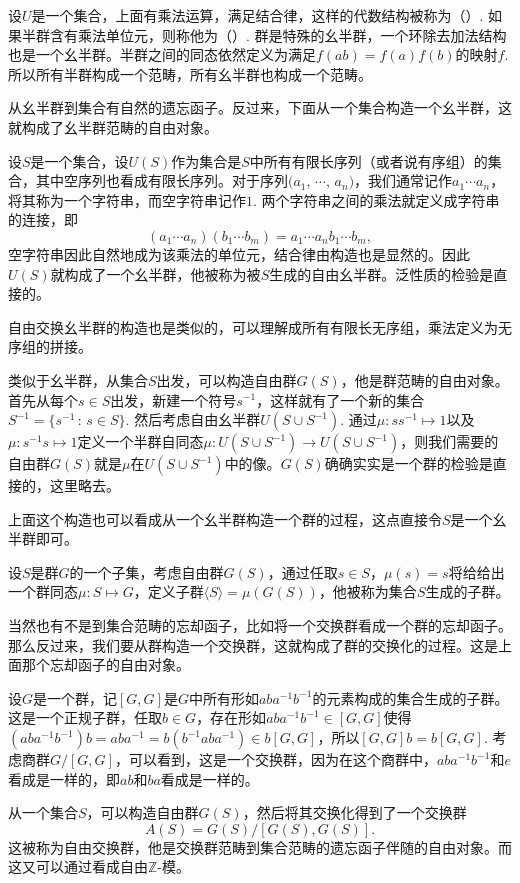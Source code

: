 \begin{para}
设$U$是一个集合，上面有乘法运算，满足结合律，这样的代数结构被称为（）. 如果半群含有乘法单位元，则称他为（）. 群是特殊的幺半群，一个环除去加法结构也是一个幺半群。半群之间的同态依然定义为满足$f(ab)=f(a)f(b)$的映射$f$. 所以所有半群构成一个范畴，所有幺半群也构成一个范畴。

从幺半群到集合有自然的遗忘函子。反过来，下面从一个集合构造一个幺半群，这就构成了幺半群范畴的自由对象。

设$S$是一个集合，设$U(S)$作为集合是$S$中所有有限长序列（或者说有序组）的集合，其中空序列也看成有限长序列。对于序列$(a_1$, $\cdots$, $a_n)$，我们通常记作$a_1\cdots a_n$，将其称为一个字符串，而空字符串记作$1$. 两个字符串之间的乘法就定义成字符串的连接，即
\[
	(a_1\cdots a_n)(b_1\cdots b_m)=a_1\cdots a_nb_1\cdots b_m,
\]
空字符串因此自然地成为该乘法的单位元，结合律由构造也是显然的。因此$U(S)$就构成了一个幺半群，他被称为被$S$生成的自由幺半群。泛性质的检验是直接的。
\end{para}

自由交换幺半群的构造也是类似的，可以理解成所有有限长无序组，乘法定义为无序组的拼接。

\begin{para}
类似于幺半群，从集合$S$出发，可以构造自由群$G(S)$，他是群范畴的自由对象。首先从每个$s\in S$出发，新建一个符号$s^{-1}$，这样就有了一个新的集合$S^{-1}=\{s^{-1}\,:\, s\in S\}$. 然后考虑自由幺半群$U(S\cup S^{-1})$. 通过$\mu: ss^{-1}\mapsto 1$以及$\mu: s^{-1}s\mapsto 1$定义一个半群自同态$\mu:U(S\cup S^{-1})\to U(S\cup S^{-1})$，则我们需要的自由群$G(S)$就是$\mu$在$U(S\cup S^{-1})$中的像。$G(S)$确确实实是一个群的检验是直接的，这里略去。
\end{para}

上面这个构造也可以看成从一个幺半群构造一个群的过程，这点直接令$S$是一个幺半群即可。

\para 设$S$是群$G$的一个子集，考虑自由群$G(S)$，通过任取$s\in S$，$\mu(s)=s$将给给出一个群同态$\mu:S\mapsto G$，定义子群$\langle S\rangle=\mu(G(S))$，他被称为集合$S$生成的子群。

\begin{para}
当然也有不是到集合范畴的忘却函子，比如将一个交换群看成一个群的忘却函子。那么反过来，我们要从群构造一个交换群，这就构成了群的交换化的过程。这是上面那个忘却函子的自由对象。

设$G$是一个群，记$[G,G]$是$G$中所有形如$aba^{-1}b^{-1}$的元素构成的集合生成的子群。这是一个正规子群，任取$b\in G$，存在形如$aba^{-1}b^{-1}\in [G,G]$使得$(aba^{-1}b^{-1})b=aba^{-1}=b(b^{-1}aba^{-1})\in b[G,G]$，所以$[G,G]b=b[G,G]$. 考虑商群$G/[G,G]$，可以看到，这是一个交换群，因为在这个商群中，$aba^{-1}b^{-1}$和$e$看成是一样的，即$ab$和$ba$看成是一样的。

从一个集合$S$，可以构造自由群$G(S)$，然后将其交换化得到了一个交换群
\[
	A(S)=G(S)/[G(S),G(S)].
\]
这被称为自由交换群，他是交换群范畴到集合范畴的遗忘函子伴随的自由对象。而这又可以通过看成自由$\mathbb{Z}$-模。
\end{para}


